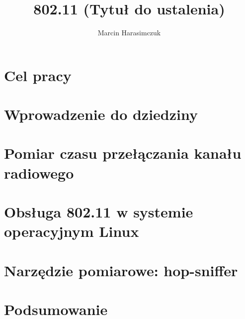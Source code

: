\documentclass[11pt,a4paper,oneside]{report}
\begin{document}
\title{ 802.11 (Tytuł do ustalenia) }
\author{ Marcin Harasimczuk }
\maketitle

\tableofcontents

\newpage
\thispagestyle{empty}
\mbox{}


\section{Cel pracy}


\section{Wprowadzenie do dziedziny}


\section{Pomiar czasu przełączania kanału radiowego}


\section{Obsługa 802.11 w systemie operacyjnym Linux}


\section{Narzędzie pomiarowe: hop-sniffer}


\section{Podsumowanie}


\nocite{*}

\end{document}
